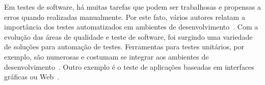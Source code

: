 \documentclass[12pt]{article}
\begin{document}
Em testes de software, há muitas tarefas que podem ser trabalhosas e propensas a erros quando realizadas manualmente. Por este fato, vários autores relatam a importância dos testes automatizados em ambientes de desenvolvimento~\cite{sbqs2013}. Com a evolução das áreas de qualidade e teste de software, foi surgindo uma variedade de soluções para automação de testes. Ferramentas para testes unitários, por exemplo, são numerosas e costumam se integrar aos ambientes de desenvolvimento~\cite{unittesting}. Outro exemplo é o teste de aplicações baseadas em interfaces gráficas ou Web~\cite{webtesting}.









\end{document}
